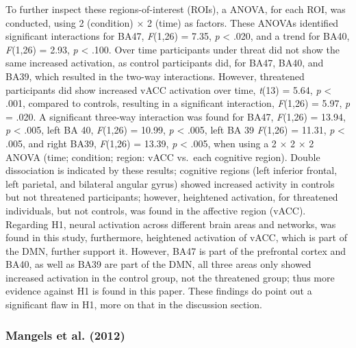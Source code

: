 \documentclass[
  stu,floatsintext]{apa7}
\begin{document}
To further inspect these regions-of-interest (ROIs), a ANOVA, for each ROI, was conducted, using 2 (condition) \(\times\) 2 (time) as factors.
These ANOVAs identified significant interactions for BA47, \emph{F}(1,26) = 7.35, \emph{p} \textless{} .020, and a trend for BA40, \emph{F}(1,26) = 2.93, \emph{p} \textless{} .100.
Over time participants under threat did not show the same increased activation, as control participants did, for BA47, BA40, and BA39, which resulted in the two-way interactions.
However, threatened participants did show increased vACC activation over time, \emph{t}(13) = 5.64, \emph{p} \textless{} .001, compared to controls, resulting in a significant interaction, \emph{F}(1,26) = 5.97, \emph{p} = .020.
A significant three-way interaction was found for BA47, \emph{F}(1,26) = 13.94, \emph{p} \textless{} .005, left BA 40, \emph{F}(1,26) = 10.99, \emph{p} \textless{} .005, left BA 39 \emph{F}(1,26) = 11.31, \emph{p} \textless{} .005, and right BA39, \emph{F}(1,26) = 13.39, \emph{p} \textless{} .005, when using a 2 \(\times\) 2 \(\times\) 2 ANOVA (time; condition; region: vACC vs.~each cognitive region).
Double dissociation is indicated by these results; cognitive regions (left inferior frontal, left parietal, and bilateral angular gyrus) showed increased activity in controls but not threatened participants; however, heightened activation, for threatened individuals, but not controls, was found in the affective region (vACC).
Regarding H1, neural activation across different brain areas and networks, was found in this study, furthermore, heightened activation of vACC, which is part of the DMN, further support it.
However, BA47 is part of the prefrontal cortex and BA40, as well as BA39 are part of the DMN, all three areas only showed increased activation in the control group, not the threatened group; thus more evidence against H1 is found in this paper.
These findings do point out a significant flaw in H1, more on that in the discussion section.

\subsubsection{Mangels et al. (2012)}\label{mangelsemotionblockspath2012}
\end{document}
